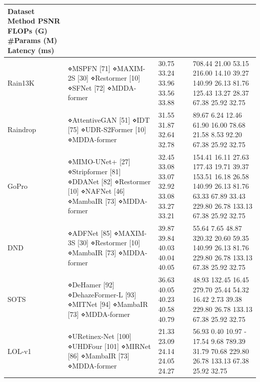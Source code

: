 \begin{tabular}{llll}
\toprule
Dataset Method PSNR FLOPs (G) \#Params (M) Latency (ms) &  &  &  \\
\midrule
Rain13K & ⋄MSPFN [71] ⋄MAXIM-2S [30] ⋄Restormer [10] ⋄SFNet [72] ⋄MDDA-former & 30.75 33.24 33.96 33.56 33.88 & 708.44 21.00 53.15 216.00 14.10 39.27 140.99 26.13 81.76 125.43 13.27 28.37 67.38 25.92 32.75 \\
Raindrop & ⋄AttentiveGAN [51] ⋄IDT [75] ⋄UDR-S2Former [10] ⋄MDDA-former & 31.55 31.87 32.64 32.78 & 89.67 6.24 12.46 61.90 16.00 78.68 21.58 8.53 92.20 67.38 25.92 32.75 \\
GoPro & ⋄MIMO-UNet+ [27] ⋄Stripformer [81] ⋄DDANet [82] ⋄Restormer [10] ⋄NAFNet [46] ⋄MambaIR [73] ⋄MDDA-former & 32.45 33.08 33.07 32.92 33.08 33.27 33.21 & 154.41 16.11 27.63 177.43 19.71 39.37 153.51 16.18 26.58 140.99 26.13 81.76 63.33 67.89 33.43 229.80 26.78 133.13 67.38 25.92 32.75 \\
DND & ⋄ADFNet [85] ⋄MAXIM-3S [30] ⋄Restormer [10] ⋄MambaIR [73] ⋄MDDA-former & 39.87 39.84 40.03 40.04 40.05 & 55.64 7.65 48.87 320.32 20.60 59.35 140.99 26.13 81.76 229.80 26.78 133.13 67.38 25.92 32.75 \\
SOTS & ⋄DeHamer [92] ⋄DehazeFormer-L [93] ⋄MITNet [94] ⋄MambaIR [73] ⋄MDDA-former & 36.63 40.05 40.23 40.58 40.79 & 48.93 132.45 16.45 279.70 25.44 54.32 16.42 2.73 39.38 229.80 26.78 133.13 67.38 25.92 32.75 \\
LOL-v1 & ⋄URetinex-Net [100] ⋄UHDFour [101] ⋄MIRNet [86] ⋄MambaIR [73] ⋄MDDA-former & 21.33 23.09 24.14 24.05 24.27 & 56.93 0.40 10.97 - 17.54 9.68 789.39 31.79 70.68 229.80 26.78 133.13 67.38 25.92 32.75 \\
\bottomrule
\end{tabular}
